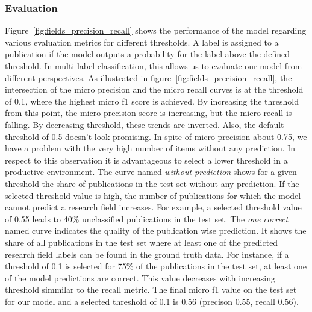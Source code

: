 \subsubsection{Evaluation}
Figure~\ref{fig:fields_precision_recall} shows the performance of the model regarding various evaluation metrics for different thresholds.
A label is assigned to a publication if the model outputs a probability for the label above the defined threshold.
In multi-label classification, this allows us to evaluate our model from different perspectives. 
As illustrated in figure~\ref{fig:fields_precision_recall}, the intersection of the micro precision and the micro recall curves is at the threshold of 0.1, where the highest micro f1 score is achieved.
By increasing the threshold from this point, the micro-precision score is increasing, but the micro recall is falling.
By decreasing threshold, these trends are inverted.
Also, the default threshold of 0.5 doesn't look promising.
In spite of micro-precision about 0.75, we have a problem with the very high number of items without any prediction. 
In respect to this observation it is advantageous to select a lower threshold in a productive environment.
The curve named \emph{without prediction} shows for a given threshold the share of publications in the test set without any prediction.
If the selected threshold value is high, the number of publications for which the model cannot predict a research field increases.
For example, a selected threshold value of 0.55 leads to 40\% unclassified publications in the test set.
The \emph{one correct} named curve indicates the quality of the publication wise prediction.
It shows the share of all publications in the test set where at least one of the predicted research field labels can be found in the ground truth data.
For instance, if a threshold of 0.1 is selected for 75\% of the publications in the test set, at least one of the model predictions are correct.
This value decreases with increasing threshold simmilar to the recall metric.
The final micro f1 value on the test set for our model and a selected threshold of 0.1 is 0.56 (precison 0.55, recall 0.56).





